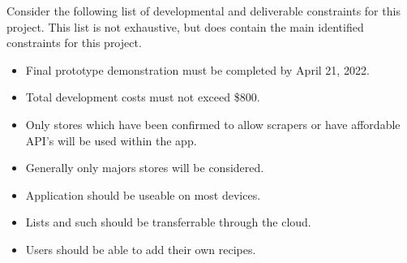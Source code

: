 %
%
%
%
%
Consider the following list of developmental and deliverable constraints for this project.  This list is not exhaustive, but does contain the main identified constraints for this project.
\begin{itemize}
  \item Final prototype demonstration must be completed by April 21, 2022.
  \item Total development costs must not exceed \$800.
  \item Only stores which have been confirmed to allow scrapers or have affordable API's will be used within the app.
  \item Generally only majors stores will be considered.
  \item Application should be useable on most devices.
  \item Lists and such should be transferrable through the cloud.
  \item Users should be able to add their own recipes.
\end{itemize}
